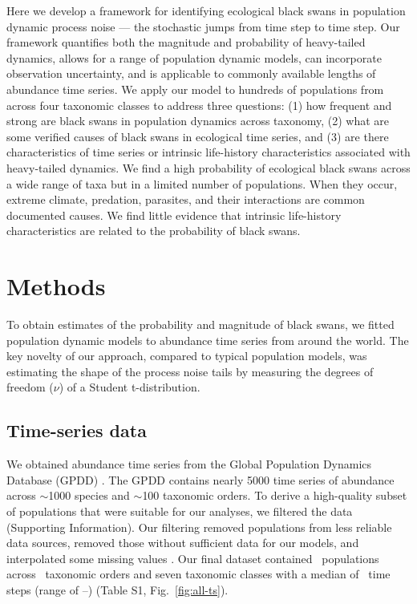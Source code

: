 Here we develop a framework for identifying ecological black swans in
population dynamic process noise --- the stochastic jumps from time step to
time step. Our framework quantifies both the magnitude and probability of
heavy-tailed dynamics, allows for a range of population dynamic models, can
incorporate observation uncertainty, and is applicable to commonly available
lengths of abundance time series. We apply our model to hundreds of populations
from across four taxonomic classes to address three questions: (1) how frequent
and strong are black swans in population dynamics across taxonomy, (2) what are
some verified causes of black swans in ecological time series, and (3) are
there characteristics of time series or intrinsic life-history characteristics
associated with heavy-tailed dynamics. We find a high probability of ecological
black swans across a wide range of taxa but in a limited number of populations.
When they occur, extreme climate, predation, parasites, and their interactions
are common documented causes. We find little evidence that intrinsic
life-history characteristics are related to the probability of black swans.

\section{Methods}

To obtain estimates of the probability and magnitude of black swans, we fitted
population dynamic models to abundance time series from around the world. The
key novelty of our approach, compared to typical population models, was
estimating the shape of the process noise tails by measuring the degrees of
freedom ($\nu$) of a Student t-distribution.

\subsection{Time-series data}

We obtained abundance time series from the Global Population Dynamics Database
(GPDD) \citep{gpdd2010}. The GPDD contains nearly 5000 time series of abundance
across $\sim$1000 species and $\sim$100 taxonomic orders. To derive
a high-quality subset of populations that were suitable for our analyses, we
filtered the data (Supporting Information). Our filtering removed populations from
less reliable data sources, removed those without sufficient data for our
models, and interpolated some missing values \citep[\textit{sensu}][]{brook2006a}.
Our final dataset contained \NPops~populations across \NOrders~taxonomic orders
and seven taxonomic classes with a median of \medianTimeSteps~time steps (range
of \minTimeSteps--\maxTimeSteps) (Table S1, Fig.~\ref{fig:all-ts}).

